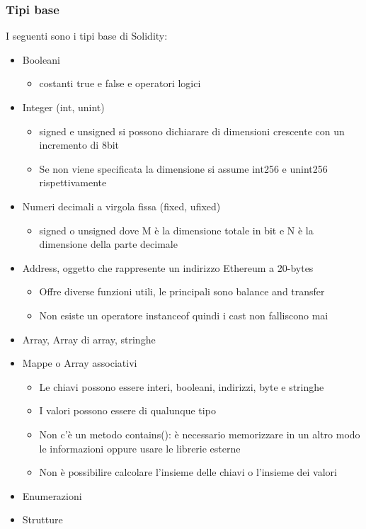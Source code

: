 \documentclass[a4paper]{article}
\begin{document}
\subsubsection{Tipi base}
I seguenti sono i tipi base di Solidity:
\begin{itemize}
    \item Booleani
    \begin{itemize}
        \item costanti true e false e operatori logici
    \end{itemize}
    \item Integer (int, unint)
    \begin{itemize}
        \item signed e unsigned si possono dichiarare di dimensioni crescente con un incremento di 8bit
        \item Se non viene specificata la dimensione si assume int256 e unint256 rispettivamente
    \end{itemize}
    \item Numeri decimali a virgola fissa (fixed, ufixed)
    \begin{itemize}
        \item signed o unsigned dove M è la dimensione totale in bit e N è la dimensione della parte decimale
    \end{itemize}
    \item Address, oggetto che rappresente un indirizzo Ethereum a 20-bytes
    \begin{itemize}
        \item Offre diverse funzioni utili, le principali sono balance and transfer
        \item Non esiste un operatore instanceof quindi i cast non falliscono mai
    \end{itemize}
    \item Array, Array di array, stringhe
    \item Mappe o Array associativi
    \begin{itemize}
        \item Le chiavi possono essere interi, booleani, indirizzi, byte e stringhe
        \item I valori possono essere di qualunque tipo
        \item Non c'è un metodo contains(): è necessario memorizzare in un altro modo le informazioni oppure usare le librerie esterne
        \item Non è possibilire calcolare l'insieme delle chiavi o l'insieme dei valori
    \end{itemize}
    \item Enumerazioni
    \item Strutture
\end{itemize}
\end{document}
